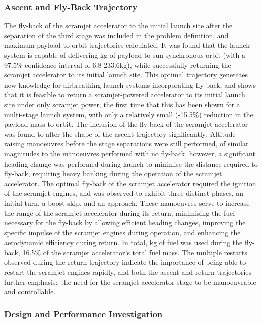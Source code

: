 \subsubsection{Ascent and Fly-Back Trajectory}

The fly-back of the scramjet accelerator to the initial launch site after the separation of the third stage was included in the problem definition, and maximum payload-to-orbit trajectories calculated. 
It was found that the launch system is capable of delivering \PayloadToOrbitStandard kg of payload to sun synchronous orbit (with a 97.5\% confidence interval of 6.8-233.6kg), while successfully returning the scramjet accelerator to its initial launch site. This optimal trajectory generates new knowledge for airbreathing launch systems incorporating fly-back, and shows that it is feasible to return a scramjet-powered accelerator to its initial launch site under only scramjet power, the first time that this has been shown for a multi-stage launch system, with only a relatively small (-15.5\%) reduction in the payload mass-to-orbit.
	The inclusion of the fly-back of the scramjet accelerator was found to alter the shape of the ascent trajectory significantly: Altitude-raising manoeuvres before the stage separations were still performed, of similar magnitudes to the manoeuvres performed with no fly-back, however, a significant heading change was performed during launch to minimise the distance required to fly-back, requiring heavy banking during the operation of the scramjet accelerator. 
The optimal fly-back of the scramjet accelerator required the ignition of the scramjet engines, and was observed to exhibit three distinct phases, an initial turn, a boost-skip, and an approach. 
These manoeuvres serve to increase the range of the scramjet accelerator during its return, minimising the fuel necessary for the fly-back by allowing efficient heading changes, improving the specific impulse of the scramjet engines during operation, and enhancing the aerodynamic efficiency during return.
 In total, \returnFuelStandard kg of fuel was used during the fly-back, 16.5\% of the scramjet accelerator's total fuel mass. The multiple restarts observed during the return trajectory indicate the importance of being able to restart the scramjet engines rapidly, and both the ascent and return trajectories further emphasise the need for the scramjet accelerator stage to be manoeuvrable and controllable. 
	
	\subsubsection{Design and Performance Investigation}
	

